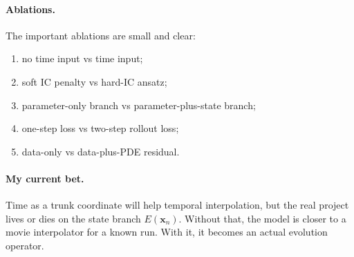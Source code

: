 \documentclass[11pt]{article}
\newcommand{\xfield}{\bm{x}}
\begin{document}
\paragraph{Ablations.}
The important ablations are small and clear:
\begin{enumerate}[leftmargin=*]
    \item no time input vs time input;
    \item soft IC penalty vs hard-IC ansatz;
    \item parameter-only branch vs parameter-plus-state branch;
    \item one-step loss vs two-step rollout loss;
    \item data-only vs data-plus-PDE residual.
\end{enumerate}

\paragraph{My current bet.}
Time as a trunk coordinate will help temporal interpolation, but the real
project lives or dies on the state branch \(E(\xfield_n)\). Without that, the
model is closer to a movie interpolator for a known run. With it, it becomes an
actual evolution operator.



\end{document}

